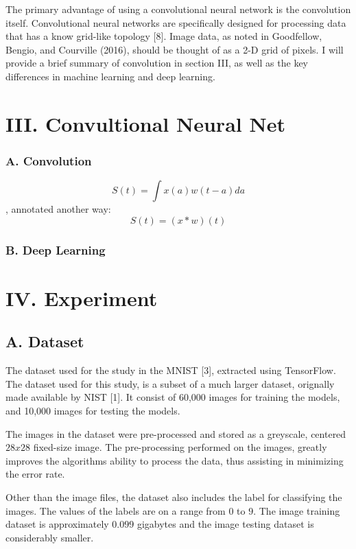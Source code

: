 \documentclass[conference,final,]{IEEEtran}
\begin{document}
The primary advantage of using a convolutional neural network is the
convolution itself. Convolutional neural networks are specifically
designed for processing data that has a know grid-like topology {[}8{]}.
Image data, as noted in Goodfellow, Bengio, and Courville (2016), should
be thought of as a 2-D grid of pixels. I will provide a brief summary of
convolution in section III, as well as the key differences in machine
learning and deep learning.

\section{III. Convultional Neural
Net}\label{iii.-convultional-neural-net}

\subsubsection{A. Convolution}\label{a.-convolution}

\[S(t)=\int x(a)w(t-a)da\] , annotated another way:\\
\[S(t)= (x*w)(t)\]

\subsubsection{B. Deep Learning}\label{b.-deep-learning}

\section{IV. Experiment}\label{iv.-experiment}

\subsection{A. Dataset}\label{a.-dataset}

The dataset used for the study in the MNIST {[}3{]}, extracted using
TensorFlow. The dataset used for this study, is a subset of a much
larger dataset, orignally made available by NIST {[}1{]}. It consist of
60,000 images for training the models, and 10,000 images for testing the
models.

The images in the dataset were pre-processed and stored as a greyscale,
centered \(28x28\) fixed-size image. The pre-processing performed on the
images, greatly improves the algorithms ability to process the data,
thus assisting in minimizing the error rate.

Other than the image files, the dataset also includes the label for
classifying the images. The values of the labels are on a range from
\(0\) to \(9\). The image training dataset is approximately \(0.099\)
gigabytes and the image testing dataset is considerably smaller.
\end{document}

